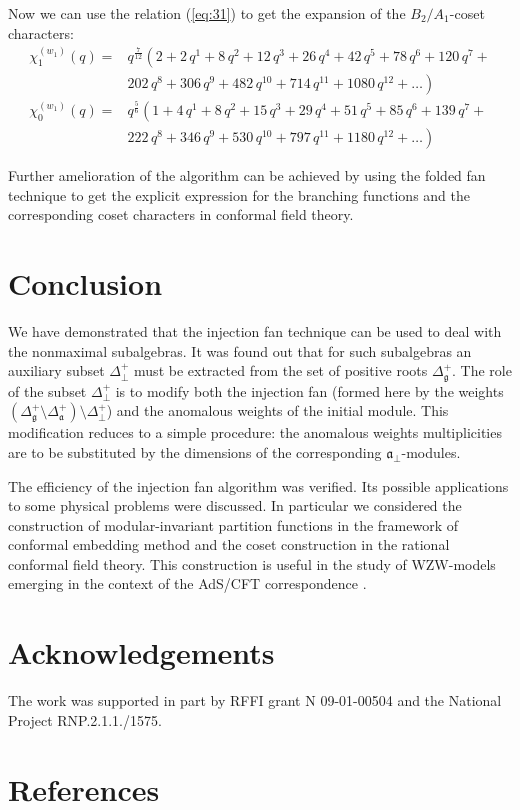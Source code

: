 \documentclass[12pt]{iopart}
\theoremstyle{definition}
\theoremstyle{definition}
\theoremstyle{definition}
\begin{document}
Now we can use the relation (\ref{eq:31}) to get the expansion of the $B_2/A_1$-coset characters:
\begin{equation*}
  \label{eq:35}
  \begin{array}{cc}
    \chi^{(w_1)}_{1}(q)= & q^{\frac{7}{12}}\left( 2+2\,q^{1}+8\,q^{2}+12\,q^{3}+26\,q^{4}+42\,q^{5}+78\,q^{6}+120\,q^{7}+\right. \\
    & \left. 202\,q^{8}+306\,q^{9}+482\,q^{10}+714\,q^{11}+1080\,q^{12}+\dots \right)\\
    \chi^{(w_1)}_{0}(q) = & q^{\frac{5}{6}}\left(1 + 4\,q^{1}+ 8\,q^{2}+ 15\,q^{3}+ 29\,q^{4}+ 51\,q^{5}+ 85\,q^{6}+ 139\,q^{7}+\right. \\
    &\left. 222\,q^{8}+ 346\,q^{9}+ 530\,q^{10}+ 797\,q^{11}+ 1180\,q^{12}+\dots\right)
  \end{array}
\end{equation*}

Further amelioration of the algorithm can be achieved by using
the folded fan technique \cite{il2010folded} to get the explicit expression
for the branching functions and the corresponding coset characters in conformal field theory.

\section{Conclusion}
\label{sec:conclusion}
We have demonstrated that the injection fan technique can be used to deal with the nonmaximal subalgebras.
It was found out that for such subalgebras an auxiliary subset $\Delta^{+}_{\bot}$ must be extracted
from the set of positive roots $\Delta_{\mathfrak{g}}^{+}$.
The role of the subset $\Delta^{+}_{\bot}$ is to modify both the injection fan (formed here by the
weights $\left(\Delta_{\mathfrak{g}}^{+} \setminus  \Delta_{\mathfrak{a}}^{+}\right) \setminus \Delta^{+}_{\bot}$)
and the anomalous weights of the initial module.
This modification reduces to a simple procedure:
the anomalous weights multiplicities are to be substituted by the dimensions of the corresponding ${\mathfrak{a}}_{\bot}$-modules.

The efficiency of the injection fan algorithm was verified.
Its possible applications to some physical problems were discussed.
In particular we considered the construction of modular-invariant partition functions
in the framework of conformal embedding method and the coset construction in the rational conformal field theory.
This construction is useful in the study of WZW-models
emerging in the context of the AdS/CFT correspondence \cite{Maldacena:2000hw,Maldacena:2000kv,Maldacena:2001km}.

\section{Acknowledgements}
The work was supported in
part by RFFI grant N 09-01-00504 and the National Project RNP.2.1.1./1575.

\section*{References}
{}

\end{document}
